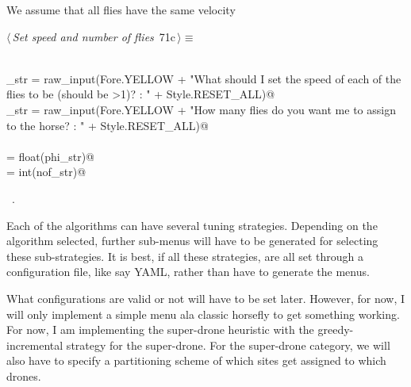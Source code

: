 \documentclass[11.5pt]{report}
\begin{document}
\vspace{-0.8cm} \newchunk We assume that all flies have the same velocity
\begin{flushleft} \small
\begin{minipage}{\linewidth}\label{scrap105}\raggedright\small
{} $\langle\,${\itshape Set speed and number of flies}\nobreak\ {\footnotesize {71c}}$\,\rangle\equiv$
\vspace{-1ex}
\begin{list}{}{} \item
\mbox{}\verb@@\\
\mbox{}\verb@phi_str = raw_input(Fore.YELLOW + "What should I set the speed of each of the flies to be (should be >1)? : " + Style.RESET_ALL)@\\
\mbox{}\verb@nof_str = raw_input(Fore.YELLOW + "How many flies do you want me to assign to the horse? : " + Style.RESET_ALL)@\\
\mbox{}\verb@@\\
\mbox{}\verb@phi = float(phi_str)@\\
\mbox{}\verb@nof = int(nof_str)@\\
\mbox{}\verb@@{\NWsep}
\end{list}
\vspace{-1.5ex}
\footnotesize
\begin{list}{}{\setlength{\itemsep}{-\parsep}\setlength{\itemindent}{-\leftmargin}}
\item \NWtxtMacroRefIn\ .

\item{}
\end{list}
\end{minipage}\vspace{4ex}
\end{flushleft}



\vspace{-0.8cm} \newchunk Each of the algorithms can have several tuning strategies. 
Depending on the algorithm selected, further sub-menus will have to be generated for 
selecting these sub-strategies. It is best, if all these strategies, are all set 
through a configuration file, like say YAML, rather than have to generate the menus. 

What configurations are valid or not will have to be set later. However, for now, I 
will only implement a simple menu ala classic horsefly to get something working. 
For now, I am implementing the super-drone heuristic with the greedy-incremental 
strategy for the super-drone. For the super-drone category, we will also have 
to specify a partitioning scheme of which sites get assigned to which drones. 
\end{document}
